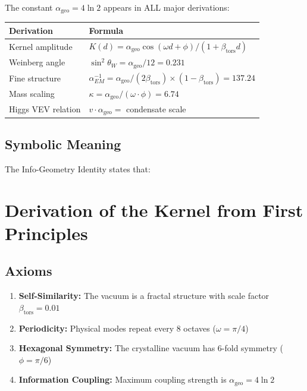 \documentclass[11pt,a4paper]{book}
\theoremstyle{remark}
\newcommand{\alphageo}{\alpha_{\text{geo}}}
\newcommand{\betators}{\beta_{\text{tors}}}
\begin{document}
The constant $\alphageo = 4\ln 2$ appears in ALL major derivations:

\begin{center}
\begin{tabular}{|l|l|}
\hline
\textbf{Derivation} & \textbf{Formula} \\
\hline
Kernel amplitude & $K(d) = \alphageo \cos(\omega d + \phi) / (1 + \betators d)$ \\
Weinberg angle & $\sin^2\theta_W = \alphageo / 12 = 0.231$ \\
Fine structure & $\alpha_{EM}^{-1} = \alphageo / (2\betators) \times (1 - \betators) = 137.24$ \\
Mass scaling & $\kappa = \alphageo / (\omega \cdot \phi) = 6.74$ \\
Higgs VEV relation & $v \cdot \alphageo = $ condensate scale \\
\hline
\end{tabular}
\end{center}

\subsection{Symbolic Meaning}

The Info-Geometry Identity states that:
\begin{center}
\end{center}

\section{Derivation of the Kernel from First Principles}

\subsection{Axioms}

\begin{enumerate}
    \item \textbf{Self-Similarity:} The vacuum is a fractal structure with scale factor $\betators = 0.01$
    \item \textbf{Periodicity:} Physical modes repeat every 8 octaves ($\omega = \pi/4$)
    \item \textbf{Hexagonal Symmetry:} The crystalline vacuum has 6-fold symmetry ($\phi = \pi/6$)
    \item \textbf{Information Coupling:} Maximum coupling strength is $\alphageo = 4\ln 2$
\end{enumerate}
\end{document}
